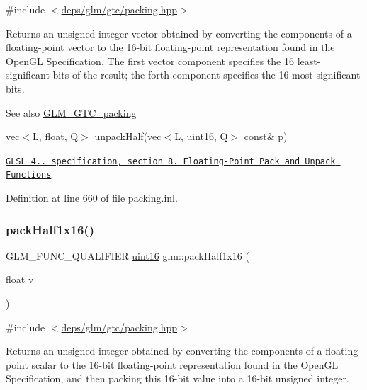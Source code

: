 {\ttfamily \#include $<$\hyperlink{gtc_2packing_8hpp}{deps/glm/gtc/packing.\+hpp}$>$}

Returns an unsigned integer vector obtained by converting the components of a floating-\/point vector to the 16-\/bit floating-\/point representation found in the Open\+GL Specification. The first vector component specifies the 16 least-\/significant bits of the result; the forth component specifies the 16 most-\/significant bits.

\begin{DoxySeeAlso}{See also}
\hyperlink{group__gtc__packing}{G\+L\+M\+\_\+\+G\+T\+C\+\_\+packing} 

vec$<$\+L, float, Q$>$ unpack\+Half(vec$<$\+L, uint16, Q$>$ const\& p) 

\href{http://www.opengl.org/registry/doc/GLSLangSpec.4.20.8.pdf}{\tt G\+L\+SL 4.. specification, section 8. Floating-\/\+Point Pack and Unpack Functions} 
\end{DoxySeeAlso}


Definition at line 660 of file packing.\+inl.

\mbox{\label{group__gtc__packing_gaba534b320836a35372e00af5771dd1a2}} 
\subsubsection{\texorpdfstring{pack\+Half1x16()}{packHalf1x16()}}
{\footnotesize\ttfamily G\+L\+M\+\_\+\+F\+U\+N\+C\+\_\+\+Q\+U\+A\+L\+I\+F\+I\+ER \hyperlink{group__gtc__type__precision_gad8c2939e1fdd8e5828b31d95c52255d5}{uint16} glm\+::pack\+Half1x16 (\begin{DoxyParamCaption}\item[{float}]{v }\end{DoxyParamCaption})}



{\ttfamily \#include $<$\hyperlink{gtc_2packing_8hpp}{deps/glm/gtc/packing.\+hpp}$>$}

Returns an unsigned integer obtained by converting the components of a floating-\/point scalar to the 16-\/bit floating-\/point representation found in the Open\+GL Specification, and then packing this 16-\/bit value into a 16-\/bit unsigned integer.

